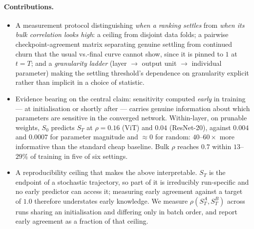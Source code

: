\documentclass{article}
\begin{document}
\paragraph{Contributions.}
\begin{itemize}\itemsep2pt
\item A measurement protocol distinguishing \emph{when a ranking settles} from \emph{when
  its bulk correlation looks high}: a ceiling from disjoint data folds; a pairwise
  checkpoint-agreement matrix separating genuine settling from continued churn that the
  usual vs.-final curve cannot show, since it is pinned to $1$ at $t{=}T$; and a
  \emph{granularity ladder} (layer $\to$ output unit $\to$ individual parameter) making the
  settling threshold's dependence on granularity explicit rather than implicit in a choice
  of statistic. %
\item Evidence bearing on the central claim: sensitivity computed \emph{early} in training
  --- at initialisation or shortly after --- carries genuine information about which
  parameters are sensitive in the converged network. Within-layer, on prunable weights,
  $S_0$ predicts $S_T$ at $\rho=0.16$ (ViT) and $0.04$ (ResNet-20), against $0.004$ and
  $0.0007$ for parameter magnitude and $\approx0$ for random: $40$--$60\times$ more
  informative than the standard cheap baseline. Bulk $\rho$ reaches $0.7$ within
  $13$--$29\%$ of training in five of six settings.
\item A reproducibility ceiling that makes the above interpretable. $S_T$ is the endpoint
  of a stochastic trajectory, so part of it is irreducibly run-specific and no early
  predictor can access it; measuring early agreement against a target of $1.0$ therefore
  understates early knowledge. We measure $\rho(S_T^A,S_T^B)$ across runs sharing an
  initialisation and differing only in batch order, and report early agreement as a
  fraction of that ceiling.

\end{itemize}
\end{document}
